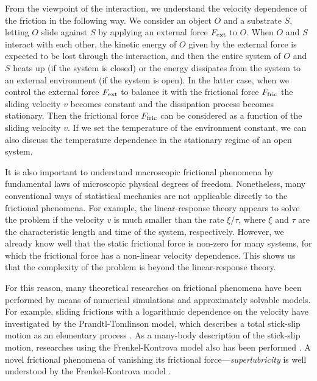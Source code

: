 From the viewpoint of the interaction, we understand the velocity dependence of the friction in the following way. We consider an object $O$ and a substrate $S$, letting $O$ slide against $S$ by applying an external force $F_{\rm ext}$ to $O$. When $O$ and $S$ interact with each other, the kinetic energy of $O$ given by the external force is expected to be lost through the interaction, and then the entire system of $O$ and $S$ heats up (if the system is closed) or the energy dissipates from the system to an external environment (if the system is open). In the latter case, when we control the external force $F_{\rm ext}$ to balance it with the frictional force $F_{\rm fric}$ the sliding velocity $v$ becomes constant and the dissipation process becomes stationary. Then the frictional force $F_{\rm fric}$ can be considered as a function of the sliding velocity $v$. If we set the temperature of the environment constant, we can also discuss the temperature dependence in the stationary regime of an open system.

It is also important to understand macroscopic frictional phenomena by fundamental laws of microscopic physical degrees of freedom.
Nonetheless, many conventional ways of statistical mechanics are not applicable directly to the frictional phenomena. For example, the linear-response theory appears to solve the problem if the velocity $v$ is much smaller than the rate $\xi/\tau$, where $\xi$ and $\tau$ are the characteristic length and time of the system, respectively. However, we already know well that the static frictional force is non-zero for many systems, for which the frictional force has a non-linear velocity dependence. This shows us that the complexity of the problem is beyond the linear-response theory.

For this reason, many theoretical researches on frictional phenomena have been performed by means of numerical simulations and approximately solvable models. For example, sliding frictions with a logarithmic dependence on the velocity have investigated by the Prandtl-Tomlinson model, which describes a total stick-slip motion as an elementary process \cite{Li2011,Sang2001,Schirmeisen2005,Muser2011,Xu2011,Jansen2010}. As a many-body description of the stick-slip motion, researches using the Frenkel-Kontrova model also has been performed \cite{Braun2011,Elmer1994a,Zheng1998,Bhattacharya2013}. A novel frictional phenomena of vanishing its frictional force---\textit{superlubricity} is well understood by the Frenkel-Kontrova model \cite{Wang2008,Benassi2015}. 

